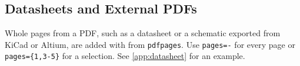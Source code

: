 \subsection{Datasheets and External PDFs}

Whole pages from a PDF, such as a datasheet or a schematic exported from
KiCad or Altium, are added with \verb|| from \texttt{pdfpages}.
Use \verb|pages=-| for every page or \verb|pages={1,3-5}| for a selection.
See \cref{app:datasheet} for an example.

\cleardoublepage
